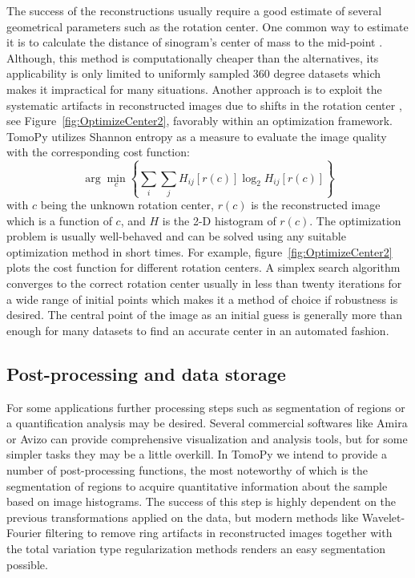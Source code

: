\documentclass[pdf]{iucr}              %
\begin{document}
The success of the reconstructions usually require a good estimate of several geometrical parameters such as the rotation center. One common way to estimate it is to calculate the distance of sinogram's center of mass to the mid-point \cite{Azevedo}. Although, this method is computationally cheaper than the alternatives, its applicability is only limited to uniformly sampled 360 degree datasets which makes it impractical for many situations. Another approach is to exploit the systematic artifacts in reconstructed images due to shifts in the rotation center \cite{donath_spie_2006}, see Figure~\ref{fig:OptimizeCenter2}, favorably within an optimization framework. TomoPy utilizes Shannon entropy as a measure to evaluate the image quality with the corresponding cost function:
\begin{equation}
\arg \min_c \left\{\sum_i \sum_jH_{ij}\left[r(c)\right]\log_2 H_{ij}\left[r(c)\right]\right\}
\end{equation}
with $c$ being the unknown rotation center, $r(c)$ is the reconstructed image which is a function of $c$, and $H$ is the 2-D histogram of $r(c)$. The optimization problem is usually well-behaved and can be solved using any suitable optimization method in short times. For example, figure~\ref{fig:OptimizeCenter2} plots the cost function for different rotation centers. A simplex search algorithm converges to the correct rotation center usually in less than twenty iterations for a wide range of initial points which makes it a method of choice if robustness is desired. The central point of the image as an initial guess is generally more than enough for many datasets to find an accurate center in an automated fashion.

\subsection{Post-processing and data storage}

For some applications further processing steps such as segmentation of regions or a quantification analysis may be desired. Several commercial softwares like Amira or Avizo can provide comprehensive visualization and analysis tools, but for some simpler tasks they may be a little overkill. In TomoPy we intend to provide a number of post-processing functions, the most noteworthy of which is the segmentation of regions to acquire quantitative information about the sample based on image histograms. The success of this step is highly dependent on the previous transformations applied on the data, but modern methods like Wavelet-Fourier filtering to remove ring artifacts in reconstructed images together with the total variation type regularization methods renders an easy segmentation possible. 
\end{document}

